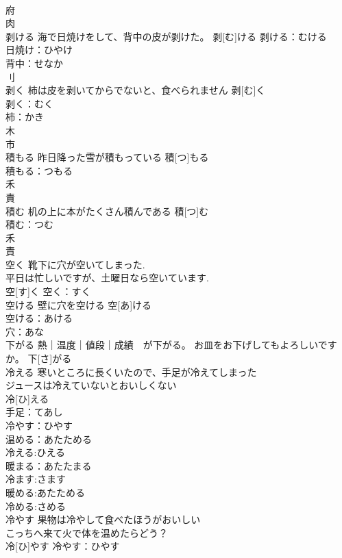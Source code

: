 \documentclass[8pt]{extreport}
\begin{document}
\begin{CJK}{UTF8}{min}
\\	府 
\\	肉 
\\	剥ける	海で日焼けをして、背中の皮が剥けた。	剥[む]ける			剥ける：むける
\\	日焼け：ひやけ
\\	背中：せなか
\\	刂 
\\	剥く	柿は皮を剥いてからでないと、食べられません	剥[む]く	
\\	剥く：むく
\\	柿：かき
\\	木 
\\	市 
\\	積もる	昨日降った雪が積もっている	積[つ]もる	
\\	積もる：つもる
\\	禾 
\\	責 
\\	積む	机の上に本がたくさん積んである	積[つ]む	
\\	積む：つむ
\\	禾 
\\	責 
\\	空く	靴下に穴が空いてしまった. 
\\	平日は忙しいですが、土曜日なら空いています. 
\\	空[す]く			空く：すく
\\	空ける	壁に穴を空ける	空[あ]ける	
\\	空ける：あける
\\	穴：あな
\\	下がる	熱｜温度｜値段｜成績　が下がる。 お皿をお下げしてもよろしいですか。	下[さ]がる	
\\	冷える	寒いところに長くいたので、手足が冷えてしまった 
\\	ジュースは冷えていないとおいしくない 
\\	冷[ひ]える	
\\	手足：てあし
\\	冷やす：ひやす
\\	温める：あたためる
\\	冷える:ひえる
\\	暖まる：あたたまる
\\	冷ます:さます
\\	暖める:あたためる
\\	冷める:さめる
\\	冷やす	果物は冷やして食べたほうがおいしい 
\\	こっちへ来て火で体を温めたらどう？ 
\\	冷[ひ]やす			冷やす：ひやす

\end{CJK}
\end{document}
